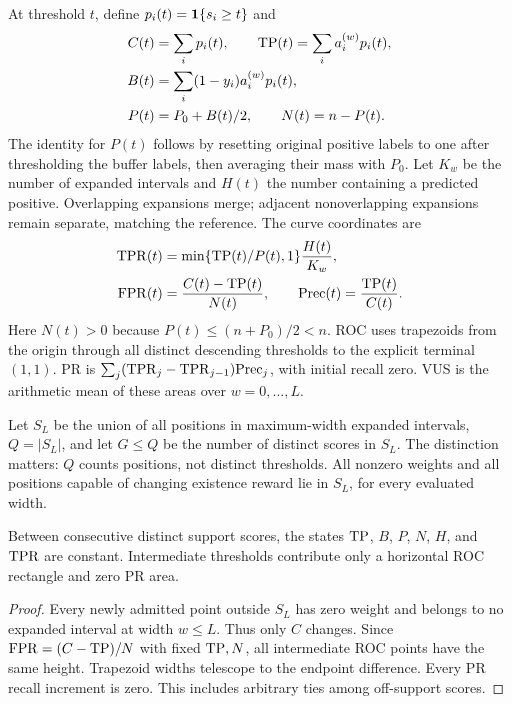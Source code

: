 At threshold $t$, define $p_i(t)=\mathbf{1}\{s_i\ge t\}$ and
\begin{align}
 C(t)&=\sum_i p_i(t),\qquad \mathrm{TP}(t)=\sum_i a_i^{(w)}p_i(t),\\
 B(t)&=\sum_i(1-y_i)a_i^{(w)}p_i(t),\\
 P(t)&=P_0+B(t)/2,\qquad N(t)=n-P(t).
\end{align}
The identity for $P(t)$ follows by resetting original positive labels to one
after thresholding the buffer labels, then averaging their mass with $P_0$.
Let $K_w$ be the number of expanded intervals and $H(t)$ the number containing
a predicted positive. Overlapping expansions merge; adjacent nonoverlapping
expansions remain separate, matching the reference. The curve coordinates are
\begin{align}
 \mathrm{TPR}(t)&=\min\{\mathrm{TP}(t)/P(t),1\}\frac{H(t)}{K_w},\\
 \mathrm{FPR}(t)&=\frac{C(t)-\mathrm{TP}(t)}{N(t)},\qquad
 \mathrm{Prec}(t)=\frac{\mathrm{TP}(t)}{C(t)}.
\end{align}
Here $N(t)>0$ because $P(t)\le(n+P_0)/2<n$. ROC uses trapezoids from the origin
through all distinct descending thresholds to the explicit terminal $(1,\allowbreak 1)$.
PR is $\sum_j(\mathrm{TPR}_j-\mathrm{TPR}_{j-1})\mathrm{Prec}_j$, with initial recall zero. VUS is
the arithmetic mean of these areas over $w=0,\allowbreak \ldots,\allowbreak L$.

Let $S_L$ be the union of all positions in maximum-width expanded intervals,
$Q=|S_L|$, and let $G\le Q$ be the number of distinct scores in $S_L$.
The distinction matters: $Q$ counts positions, not distinct thresholds.
All nonzero weights and all positions capable of changing existence reward
lie in $S_L$, for every evaluated width.

\begin{lemma}
Between consecutive distinct support scores, the states $\mathrm{TP}$, $B$, $P$, $N$,
$H$, and $\mathrm{TPR}$ are constant. Intermediate thresholds contribute only a
horizontal ROC rectangle and zero PR area.
\end{lemma}
\begin{proof}
Every newly admitted point outside $S_L$ has zero weight and belongs to no
expanded interval at width $w\le L$. Thus only $C$ changes. Since
$\mathrm{FPR}=(C-\mathrm{TP})/N$ with fixed $\mathrm{TP},\allowbreak N$, all intermediate ROC points have the same
height. Trapezoid widths telescope to the endpoint difference. Every PR recall
increment is zero. This includes arbitrary ties among off-support scores.
\end{proof}

